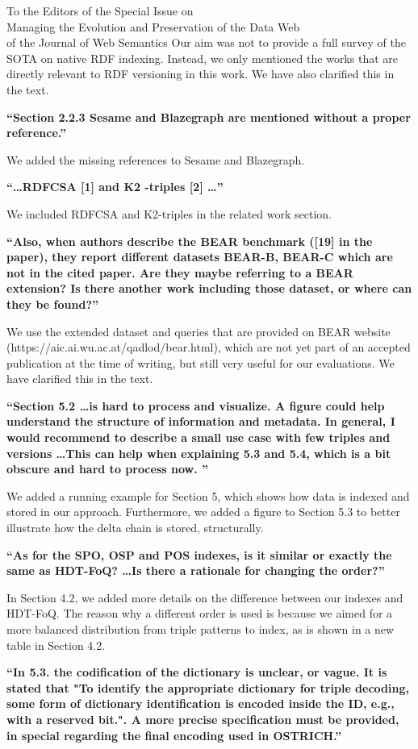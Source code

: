 \documentclass{letter}
\newcounter{section}
\begin{document}
\begin{letter}{To the Editors of the Special Issue on\\Managing the Evolution and Preservation of the Data Web\\of the Journal of Web Semantics}
Our aim was not to provide a full survey of the SOTA on native RDF indexing.
Instead, we only mentioned the works that are directly relevant to RDF versioning in this work.
We have also clarified this in the text.

\textbf{\enquote{Section 2.2.3 Sesame and Blazegraph are mentioned without a proper reference.}}

We added the missing references to Sesame and Blazegraph.

\textbf{\enquote{\ldots RDFCSA [1] and K2 -triples [2] \ldots}}

We included RDFCSA and K2-triples in the related work section.

\textbf{\enquote{Also, when authors describe the BEAR benchmark ([19] in the paper), they report different datasets BEAR-B, BEAR-C which are not in the cited paper. Are they maybe referring to a BEAR extension? Is there another work including those dataset, or where can they be found?}}

We use the extended dataset and queries that are provided on BEAR website \\(https://aic.ai.wu.ac.at/qadlod/bear.html),
which are not yet part of an accepted publication at the time of writing,
but still very useful for our evaluations.
We have clarified this in the text.

\textbf{\enquote{Section 5.2 \ldots is hard to process and visualize. A figure could help understand the structure of information and metadata. In general, I would recommend to describe a small use case with few triples and versions \ldots This can help when explaining 5.3 and 5.4, which is a bit obscure and hard to process now. }}

We added a running example for Section 5, which shows how data is indexed and stored in our approach.
Furthermore, we added a figure to Section 5.3 to better illustrate how the delta chain is stored, structurally.

\textbf{\enquote{As for the SPO, OSP and POS indexes, is it similar or exactly the same as HDT-FoQ? \ldots Is there a rationale for changing the order?}}

In Section 4.2, we added more details on the difference between our indexes and HDT-FoQ.
The reason why a different order is used is because we aimed for a more balanced distribution from triple patterns to index,
as is shown in a new table in Section 4.2.

\textbf{\enquote{In 5.3. the codification of the dictionary is unclear, or vague. It is stated that "To identify the appropriate dictionary for triple decoding, some form of dictionary identification is encoded inside the ID, e.g., with a reserved bit.". A more precise specification must be provided, in special regarding the final encoding used in OSTRICH.}}


\end{letter}
\end{document}
